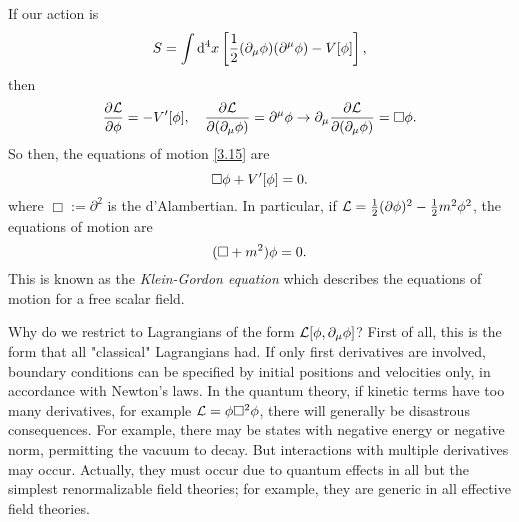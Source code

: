 \begin{ej}
	If our action is
	\begin{equation}
  S=\int\dd^4x\left[\frac{1}{2}(\partial_\mu\phi)(\partial^\mu\phi)  -V[\phi ]\right],
\end{equation}
then
\begin{equation}
  \pdv{\mathcal{L}}{\phi}=-V'[\phi],\quad \pdv{\mathcal{L}}{(\partial_\mu\phi)}=\partial^\mu\phi \to \partial_\mu \pdv{\mathcal{L}}{(\partial_\mu\phi)}=\Box \phi .
\end{equation}
So then, the equations of motion \eqref{3.15} are
\begin{equation}
  \Box \phi+V'[\phi]=0.
\end{equation}
where $\Box:=\partial^2$ is the d'Alambertian. In particular, if $\mathcal{L} =\frac{1}{2}(\partial\phi )^2-\frac{1}{2}m^2\phi^2$, the equations of motion are
\begin{equation}
  (\Box +m^2)\phi =0.
\end{equation}
This is known as the \textit{Klein-Gordon equation} which describes the equations of motion for a free scalar field.
\end{ej}
Why do we restrict to Lagrangians of the form $\mathcal{L}[\phi,\partial_\mu\phi]$? First of all, this is the form that all "classical" Lagrangians had. If only first derivatives are involved, boundary conditions can be specified by initial positions and velocities only, in accordance with Newton's laws. In the quantum theory, if kinetic terms have too many derivatives, for example $\mathcal{L}=\phi\Box^2\phi $, there will generally be disastrous consequences. For example, there may be states with negative energy or negative norm, permitting the vacuum to decay. But interactions with multiple derivatives may occur. Actually, they must occur due to quantum effects in all but the simplest renormalizable field theories; for example, they are generic in all effective field theories.




